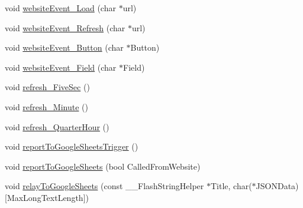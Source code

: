 \begin{DoxyCompactItemize}
\item 
void \hyperlink{class_grow_box_a486cdc90cf59c3059c96b3f021eec5d5}{website\+Event\+\_\+\+Load} (char $\ast$url)
\item 
void \hyperlink{class_grow_box_aa75f2898bbac66ab08cb257e4285f51e}{website\+Event\+\_\+\+Refresh} (char $\ast$url)
\item 
void \hyperlink{class_grow_box_ad246a22690da3301345b0337aab8258f}{website\+Event\+\_\+\+Button} (char $\ast$Button)
\item 
void \hyperlink{class_grow_box_a5c5ba0de9289075db990a15a5c0b7634}{website\+Event\+\_\+\+Field} (char $\ast$Field)
\item 
void \hyperlink{class_grow_box_ad3c74a1bbf508489f113215d1f4ae43f}{refresh\+\_\+\+Five\+Sec} ()
\item 
void \hyperlink{class_grow_box_a8763d725baee8237bc63865d464375d8}{refresh\+\_\+\+Minute} ()
\item 
void \hyperlink{class_grow_box_ac542032f42c8d6eac941ba4d98b73447}{refresh\+\_\+\+Quarter\+Hour} ()
\item 
void \hyperlink{class_grow_box_a45f0e8f17bae077486e5839d621cdf5b}{report\+To\+Google\+Sheets\+Trigger} ()
\item 
void \hyperlink{class_grow_box_a8070acc30dff79b90ff5d813fab1921f}{report\+To\+Google\+Sheets} (bool Called\+From\+Website)
\item 
void \hyperlink{class_grow_box_aac4b1240925ce9791d1a1c804839d345}{relay\+To\+Google\+Sheets} (const \+\_\+\+\_\+\+Flash\+String\+Helper $\ast$Title, char($\ast$J\+S\+O\+N\+Data)\mbox{[}Max\+Long\+Text\+Length\mbox{]})
\end{DoxyCompactItemize}
